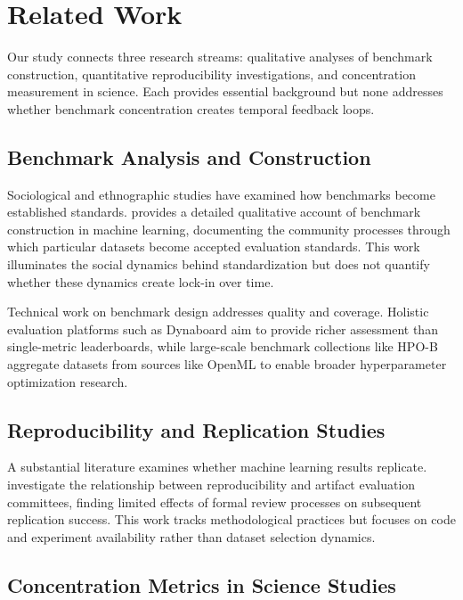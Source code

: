 \section{Related Work}

Our study connects three research streams: qualitative analyses of benchmark construction, quantitative reproducibility investigations, and concentration measurement in science. Each provides essential background but none addresses whether benchmark concentration creates temporal feedback loops.

\subsection{Benchmark Analysis and Construction}

Sociological and ethnographic studies have examined how benchmarks become established standards. \citet{engdahl2024benchmark} provides a detailed qualitative account of benchmark construction in machine learning, documenting the community processes through which particular datasets become accepted evaluation standards. This work illuminates the social dynamics behind standardization but does not quantify whether these dynamics create lock-in over time.

Technical work on benchmark design addresses quality and coverage. Holistic evaluation platforms such as Dynaboard \citep{ma2021dynaboard} aim to provide richer assessment than single-metric leaderboards, while large-scale benchmark collections like HPO-B \citep{pineda2021hpob} aggregate datasets from sources like OpenML to enable broader hyperparameter optimization research.

\subsection{Reproducibility and Replication Studies}

A substantial literature examines whether machine learning results replicate. \citet{olszewski2023reproducibility} investigate the relationship between reproducibility and artifact evaluation committees, finding limited effects of formal review processes on subsequent replication success. This work tracks methodological practices but focuses on code and experiment availability rather than dataset selection dynamics.

\subsection{Concentration Metrics in Science Studies}

